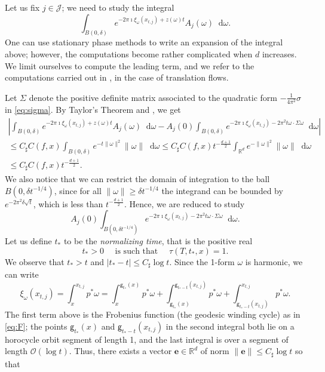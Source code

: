\documentclass[11pt,letterpaper]{amsart}
\newcommand \R {{ \mathbb R}}
\newcommand \sC {{C_\sharp}}
\newcommand{\geo}{\mathsf{g}}
\newcommand*{\diff}{\mathop{}\!\mathrm{d}}
\newcommand{\eb}{\mathbf{e}}
\theoremstyle{definition}
\begin{document}
Let us fix $j \in \mathcal{J}$; we need to study the integral
\[
\int_{B(0,\delta)} e^{- 2 \pi \imath \xi_{\omega}(x_{t,j})+z(\omega) t } A_j(\omega) \diff \omega.
\]
One can use stationary phase methods to write an expansion of the integral above; however, the computations become rather complicated when $d$ increases. We limit ourselves to compute the leading term, and we refer to the computations carried out in \cite{BFRT}, in the case of translation flows.


Let $\Sigma$ denote the positive definite matrix associated to the quadratic form $-\frac{1}{4\pi^2}\sigma$ in \eqref{eq:sigma}. By Taylor's Theorem and , we get
\begin{multline*}
	\left\lvert \int_{B(0,\delta)} e^{- 2 \pi \imath \xi_{\omega}(x_{t,j})+z(\omega) t } A_j(\omega) \diff \omega - A_j(0)\int_{B(0,\delta)} e^{- 2 \pi \imath \xi_{\omega}(x_{t,j}) -2\pi^2 t \omega \cdot \Sigma \omega }  \diff \omega \right\rvert \\ 
	\leq \sC C(f,x) \int_{B(0,\delta)} e^{-t \|\omega \|^2  } \|\omega\| \diff \omega 
	\leq \sC C(f,x) t^{-\frac{d+1}{2}} \int_{\R^d} e^{-\|\omega\|^2  } \|\omega\| \diff \omega \\  
	\leq \sC C(f,x) t^{-\frac{d+1}{2}}.
\end{multline*} 
We also notice that we can restrict the domain of integration to the ball $B(0,\delta t^{-1/4})$, since for all $\|\omega\| \geq \delta t^{-1/4}$ the integrand can be bounded by $e^{-2\pi^2 \delta \sqrt{t}}$, which is less than $t^{-\frac{d+1}{2}}$.
Hence, we are reduced to study 
\[
A_j(0)\int_{B(0,\delta t^{-1/4})} e^{- 2 \pi \imath \xi_{\omega}(x_{t,j}) -2\pi^2 t \omega \cdot \Sigma \omega }  \diff \omega.
\]
Let us define $t_{\ast}$ to be the \emph{normalizing time}, that is the positive real 
\begin{equation}\label{eq:choice_t_ast} 
t_{\ast} >0 \quad  \text{ is such that } \quad  \tau(T,t_{\ast},x)=1.
\end{equation}
We observe that $t_{\ast} > t$ and $|t_{\ast} - t| \leq \sC \log t$. Since the 1-form $\omega$ is harmonic, we can write
\[
\xi_{\omega}(x_{t,j}) = \int_x^{x_{t,j}}p^{\ast}\omega =  \int_x^{\geo_{t_{\ast}}(x)}p^{\ast}\omega + \int_{\geo_{t_{\ast}}(x)}^{\geo_{t_{\ast}-t}(x_{t,j})}p^{\ast}\omega + \int_{\geo_{t_{\ast}-t}(x_{t,j})}^{x_{t,j}}p^{\ast}\omega. 
\] 
The first term above is the Frobenius function (the geodesic winding cycle) as in \eqref{eq:F}; the points $\geo_{t_{\ast}}(x)$ and $\geo_{t_{\ast}-t}(x_{t,j})$ in the second integral both lie on a horocycle orbit segment of length 1, and the last integral is over a segment of length $\mathcal{O}(\log t)$. Thus, there exists a vector $\eb \in \R^d$ of norm $\|\eb\|\leq \sC\log t$ so that 
\end{document}
